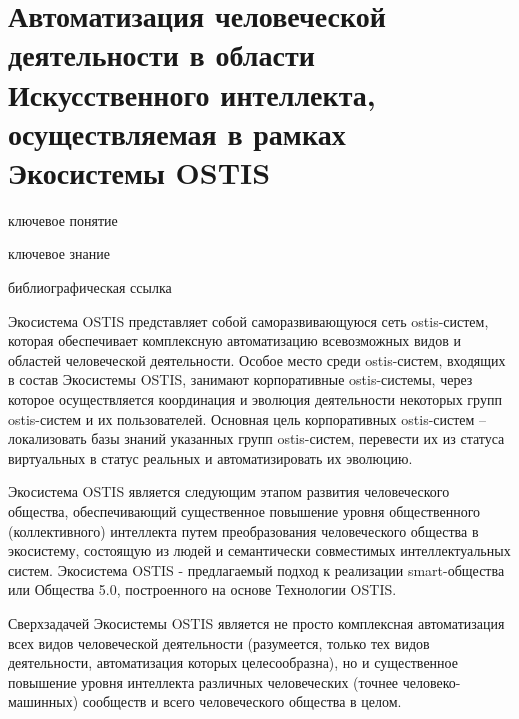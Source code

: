 \section{Автоматизация человеческой деятельности в области Искусственного интеллекта, осуществляемая в рамках Экосистемы OSTIS}
{\label{sec_human_activity_automation}} 

\begin{SCn}

\bigskip

\begin{scnrelfromlist}{ключевое понятие}
\end{scnrelfromlist}

\bigskip

\begin{scnrelfromlist}{ключевое знание}
\end{scnrelfromlist}

\bigskip

\begin{scnrelfromlist}{библиографическая ссылка}
\end{scnrelfromlist}

\end{SCn}

Экосистема OSTIS представляет собой саморазвивающуюся сеть ostis-систем, которая обеспечивает комплексную автоматизацию всевозможных видов и областей человеческой деятельности. 
Особое место среди ostis-систем, входящих в состав Экосистемы OSTIS, занимают корпоративные ostis-системы, через которое осуществляется координация и эволюция деятельности некоторых групп ostis-систем и их пользователей. 
Основная цель корпоративных ostis-систем – локализовать базы знаний указанных групп ostis-систем, перевести их из статуса виртуальных в статус реальных и автоматизировать их эволюцию.

Экосистема OSTIS является следующим этапом развития человеческого общества, обеспечивающий существенное повышение уровня общественного (коллективного) интеллекта путем преобразования человеческого общества в экосистему, состоящую из людей и семантически совместимых интеллектуальных систем. 
Экосистема OSTIS - предлагаемый подход к реализации smart-общества или Общества 5.0, построенного на основе Технологии OSTIS.

Сверхзадачей Экосистемы OSTIS является не просто комплексная автоматизация всех видов человеческой деятельности (разумеется, только тех видов деятельности, автоматизация которых целесообразна), но и существенное повышение уровня интеллекта различных человеческих (точнее человеко-машинных) сообществ и всего человеческого общества в целом.